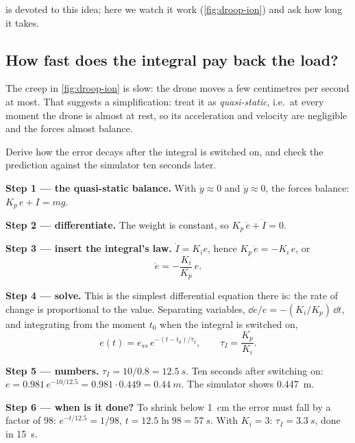  is devoted to this idea; here we watch it work (\cref{fig:droop-ion}) and ask how long it takes.


\subsection{How fast does the integral pay back the load?}
The creep in \cref{fig:droop-ion} is slow: the drone moves a few centimetres per second at most. That suggests a simplification: treat it as \emph{quasi-static}, i.e.\ at every moment the drone is almost at rest, so its acceleration and velocity are negligible and the forces almost balance.

\begin{example}
\label{ex:droop-tau}
Derive how the error decays after the integral is switched on, and check the prediction against the simulator ten seconds later.

\textbf{Step 1 — the quasi-static balance.} With $\ddot y \approx 0$ and $\dot y \approx 0$, the forces balance: $K_p\,e + I = mg$.

\textbf{Step 2 — differentiate.} The weight is constant, so $K_p\,\dot e + \dot I = 0$.

\textbf{Step 3 — insert the integral's law.} $\dot I = K_i e$, hence $K_p\,\dot e = -K_i\,e$, or
\begin{equation*}
  \dot e = -\frac{K_i}{K_p}\,e .
\end{equation*}

\textbf{Step 4 — solve.} This is the simplest differential equation there is: the rate of change is proportional to the value. Separating variables, $\dd e/e = -(K_i/K_p)\,\dd t$, and integrating from the moment $t_0$ when the integral is switched on,
\begin{equation}\label{eq:droop-tau}
  e(t) = e_{ss}\,e^{-(t-t_0)/\tau_I},\qquad \tau_I = \frac{K_p}{K_i}.
\end{equation}

\textbf{Step 5 — numbers.} $\tau_I = 10/0.8 = \SI{12.5}{s}$. Ten seconds after switching on: $e = 0.981\,e^{-10/12.5} = 0.981 \cdot 0.449 = \SI{0.44}{m}$. The simulator shows \SI{0.447}{m}.

\textbf{Step 6 — when is it done?} To shrink below \SI{1}{cm} the error must fall by a factor of 98: $e^{-t/12.5} = 1/98$, $t = 12.5\ln 98 = \SI{57}{s}$. With $K_i = 3$: $\tau_I = \SI{3.3}{s}$, done in \SI{15}{s}.
\end{example}


